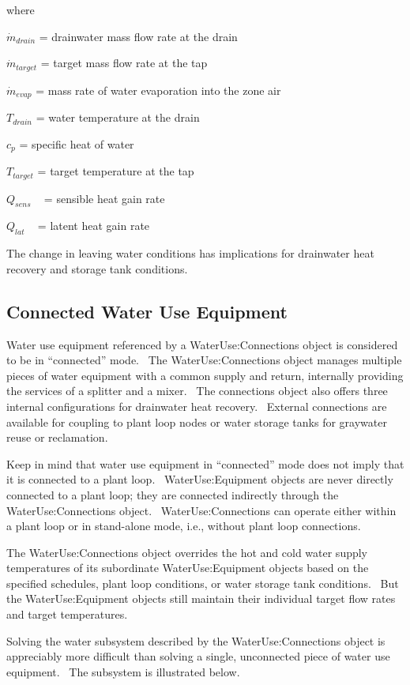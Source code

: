 where

\({\dot m_{drain}}\) = drainwater mass flow rate at the drain

\({\dot m_{target}}\) = target mass flow rate at the tap

\({\dot m_{evap}}\) = mass rate of water evaporation into the zone air

\({T_{drain}}\) = water temperature at the drain

\({c_p}\) = specific heat of water

\({T_{target}}\) = target temperature at the tap

\({Q_{sens}}\) ~ = sensible heat gain rate

\({Q_{lat}}\) ~ = latent heat gain rate

The change in leaving water conditions has implications for drainwater heat recovery and storage tank conditions.

\subsection{Connected Water Use Equipment}\label{connected-water-use-equipment}

Water use equipment referenced by a WaterUse:Connections object is considered to be in ``connected'' mode.~ The WaterUse:Connections object manages multiple pieces of water equipment with a common supply and return, internally providing the services of a splitter and a mixer.~ The connections object also offers three internal configurations for drainwater heat recovery.~ External connections are available for coupling to plant loop nodes or water storage tanks for graywater reuse or reclamation.

Keep in mind that water use equipment in ``connected'' mode does not imply that it is connected to a plant loop.~ WaterUse:Equipment objects are never directly connected to a plant loop; they are connected indirectly through the WaterUse:Connections object.~ WaterUse:Connections can operate either within a plant loop or in stand-alone mode, i.e., without plant loop connections.

The WaterUse:Connections object overrides the hot and cold water supply temperatures of its subordinate WaterUse:Equipment objects based on the specified schedules, plant loop conditions, or water storage tank conditions.~ But the WaterUse:Equipment objects still maintain their individual target flow rates and target temperatures.

Solving the water subsystem described by the WaterUse:Connections object is appreciably more difficult than solving a single, unconnected piece of water use equipment.~ The subsystem is illustrated below.

